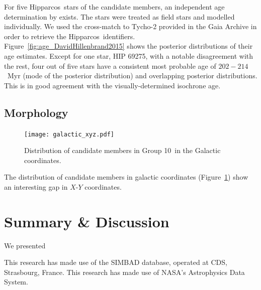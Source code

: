 \documentclass[modern,letterpaper]{aastex61}
\newcommand{\hipparcos}{Hipparcos}
\newcommand{\groupTen}{Group 10}
\newcommand{\todo}[1]{{\color{crimson}#1}}
\begin{document}
For five \hipparcos\ stars of the candidate members,
an independent age determination by \citet{2015ApJ...804..146D} exists.
The stars were treated as field stars and modelled individually.
We used the cross-match to Tycho-2 provided in the Gaia Archive
in order to retrieve the \hipparcos\ identifiers.
Figure~\ref{fig:age_DavidHillenbrand2015} shows the posterior distributions
of their age estimates.
Except for one star, HIP 69275, with a notable disagreement with the rest,
four out of five stars have a consistent most probable age of $202-214$~Myr
(mode of the posterior distribution) and overlapping posterior distributions.
This is in good agreement with the visually-determined isochrone age.


\subsection{Morphology}

\begin{figure}
  \texttt{[image: galactic\_xyz.pdf]}
  \caption{Distribution of candidate members in \groupTen\ in
    the Galactic coordinates.}
  \label{fig:galactic_xyz}
\end{figure}

The distribution of candidate members in galactic coordinates
(Figure~\ref{fig:galactic_xyz}) show an interesting gap in $X$-$Y$ coordinates.




\section{Summary \& Discussion}
\label{sec:discussion}

We presented

% 




\acknowledgements
This research has made use of the SIMBAD database,
operated at CDS, Strasbourg, France.
This research has made use of NASA's Astrophysics Data System.



\end{document}
